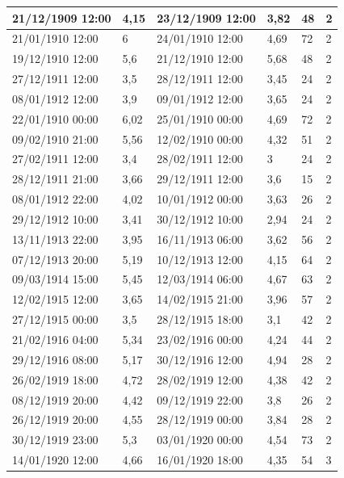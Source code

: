 \documentclass[11pt]{article}
\begin{document}
\begin{longtable}{|l|p{2.3cm}|l|p{2.3cm}|l|l|}
        21/12/1909 12:00 & 4,15 & 23/12/1909 12:00 & 3,82 & 48 & 2 \\ \hline
        21/01/1910 12:00 & 6 & 24/01/1910 12:00 & 4,69 & 72 & 2 \\ \hline
        19/12/1910 12:00 & 5,6 & 21/12/1910 12:00 & 5,68 & 48 & 2 \\ \hline
        27/12/1911 12:00 & 3,5 & 28/12/1911 12:00 & 3,45 & 24 & 2 \\ \hline
        08/01/1912 12:00 & 3,9 & 09/01/1912 12:00 & 3,65 & 24 & 2 \\ \hline
        22/01/1910 00:00 & 6,02 & 25/01/1910 00:00 & 4,69 & 72 & 2 \\ \hline
        09/02/1910 21:00 & 5,56 & 12/02/1910 00:00 & 4,32 & 51 & 2 \\ \hline
        27/02/1911 12:00 & 3,4 & 28/02/1911 12:00 & 3 & 24 & 2 \\ \hline
        28/12/1911 21:00 & 3,66 & 29/12/1911 12:00 & 3,6 & 15 & 2 \\ \hline
        08/01/1912 22:00 & 4,02 & 10/01/1912 00:00 & 3,63 & 26 & 2 \\ \hline
        29/12/1912 10:00 & 3,41 & 30/12/1912 10:00 & 2,94 & 24 & 2 \\ \hline
        13/11/1913 22:00 & 3,95 & 16/11/1913 06:00 & 3,62 & 56 & 2 \\ \hline
        07/12/1913 20:00 & 5,19 & 10/12/1913 12:00 & 4,15 & 64 & 2 \\ \hline
        09/03/1914 15:00 & 5,45 & 12/03/1914 06:00 & 4,67 & 63 & 2 \\ \hline
        12/02/1915 12:00 & 3,65 & 14/02/1915 21:00 & 3,96 & 57 & 2 \\ \hline
        27/12/1915 00:00 & 3,5 & 28/12/1915 18:00 & 3,1 & 42 & 2 \\ \hline
        21/02/1916 04:00 & 5,34 & 23/02/1916 00:00 & 4,24 & 44 & 2 \\ \hline
        29/12/1916 08:00 & 5,17 & 30/12/1916 12:00 & 4,94 & 28 & 2 \\ \hline
        26/02/1919 18:00 & 4,72 & 28/02/1919 12:00 & 4,38 & 42 & 2 \\ \hline
        08/12/1919 20:00 & 4,42 & 09/12/1919 22:00 & 3,8 & 26 & 2 \\ \hline
        26/12/1919 20:00 & 4,55 & 28/12/1919 00:00 & 3,84 & 28 & 2 \\ \hline
        30/12/1919 23:00 & 5,3 & 03/01/1920 00:00 & 4,54 & 73 & 2 \\ \hline
        14/01/1920 12:00 & 4,66 & 16/01/1920 18:00 & 4,35 & 54 & 3 \\ \hline

\end{longtable}
\end{document}
